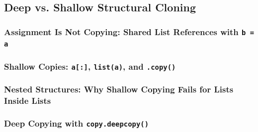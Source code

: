 \subsection{Deep vs. Shallow Structural Cloning}
\subsubsection{Assignment Is Not Copying: Shared List References with \texttt{b = a}}
\subsubsection{Shallow Copies: \texttt{a[:]}, \texttt{list(a)}, and \texttt{.copy()}}
\subsubsection{Nested Structures: Why Shallow Copying Fails for Lists Inside Lists}
\subsubsection{Deep Copying with \texttt{copy.deepcopy()}}
